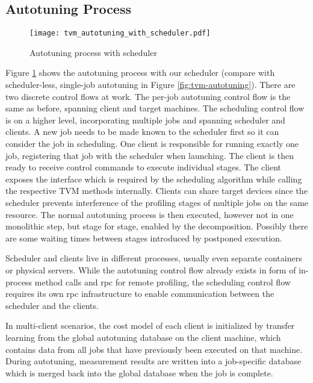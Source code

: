 \subsection{Autotuning Process}
\begin{figure}[ht]
	\centering
	\texttt{[image: tvm\_autotuning\_with\_scheduler.pdf]}%
	\caption{Autotuning process with scheduler}
	\label{fig:tvm-autotuning-with-scheduler}
\end{figure}

Figure \ref{fig:tvm-autotuning-with-scheduler} shows the autotuning process with our scheduler (compare with scheduler-less, single-job autotuning in Figure \ref{fig:tvm-autotuning}). There are two discrete control flows at work. The per-job autotuning control flow is the same as before, spanning client and target machines. The scheduling control flow is on a higher level, incorporating multiple jobs and spanning scheduler and clients. A new job needs to be made known to the scheduler first so it can consider the job in scheduling. One client is responsible for running exactly one job, registering that job with the scheduler when launching. The client is then ready to receive control commands to execute individual stages. The client exposes the interface which is required by the scheduling algorithm while calling the respective TVM methods internally. Clients can share target devices since the scheduler prevents interference of the profiling stages of multiple jobs on the same resource. The normal autotuning process is then executed, however not in one monolithic step, but stage for stage, enabled by the decomposition. Possibly there are some waiting times between stages introduced by postponed execution.

Scheduler and clients live in different processes, usually even separate containers or physical servers. While the autotuning control flow already exists in form of in-process method calls and \gls{rpc} for remote profiling, the scheduling control flow requires its own \gls{rpc} infrastructure to enable communication between the scheduler and the clients.

In multi-client scenarios, the cost model of each client is initialized by transfer learning from the global autotuning database on the client machine, which contains data from all jobs that have previously been executed on that machine. During autotuning, measurement results are written into a job-specific database which is merged back into the global database when the job is complete.

